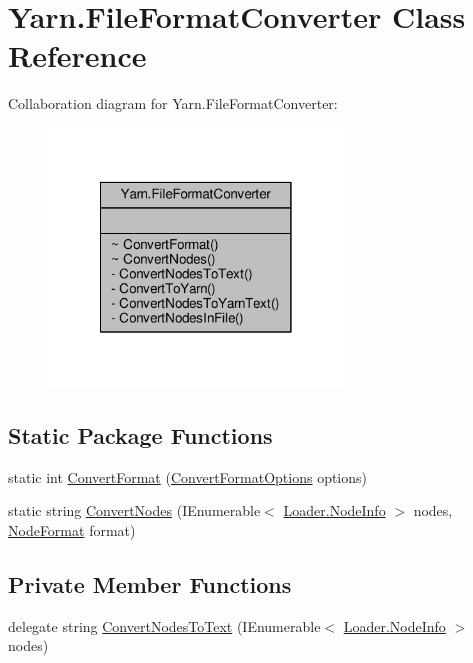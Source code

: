 \hypertarget{a00102}{\section{Yarn.\-File\-Format\-Converter Class Reference}
\label{a00102}
}


Collaboration diagram for Yarn.\-File\-Format\-Converter\-:
\nopagebreak
\begin{figure}[H]
\begin{center}
\leavevmode
\includegraphics[width=222pt]{a00641}
\end{center}
\end{figure}
\subsection*{Static Package Functions}
\begin{DoxyCompactItemize}
\item 
static int \hyperlink{a00102_aa4db4ccac799c5f047a8b1a9efbe109d}{Convert\-Format} (\hyperlink{a00057}{Convert\-Format\-Options} options)
\item 
static string \hyperlink{a00102_a85596df924468279b2dc44a9f31d8bad}{Convert\-Nodes} (I\-Enumerable$<$ \hyperlink{a00133}{Loader.\-Node\-Info} $>$ nodes, \hyperlink{a00050_ad7ebb46e7309ead8767383a672b3272f}{Node\-Format} format)
\end{DoxyCompactItemize}
\subsection*{Private Member Functions}
\begin{DoxyCompactItemize}
\item 
delegate string \hyperlink{a00102_af9bd5d832fdd2bcbdc626d9f8632e05c}{Convert\-Nodes\-To\-Text} (I\-Enumerable$<$ \hyperlink{a00133}{Loader.\-Node\-Info} $>$ nodes)
\end{DoxyCompactItemize}
